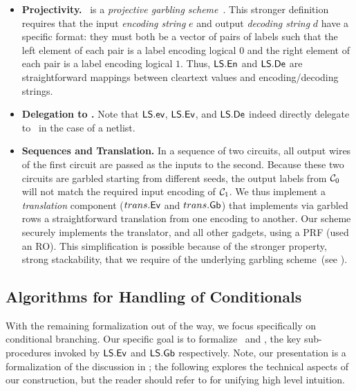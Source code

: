 \begin{itemize}
  \item \textbf{Projectivity.} \ourschemelong\
    is a \emph{projective garbling scheme}~\cite{CCS:BelHoaRog12}.
    This stronger definition requires that the input \emph{encoding string}
    $e$ and output \emph{decoding string} $d$ have a specific format:
    they must both be a vector of pairs of labels such that the left
    element of each pair is a label encoding logical $0$ and the right
    element of each pair is a label encoding logical $1$.
    Thus, $\textsf{LS}.\textsf{En}$ and $\textsf{LS}.\textsf{De}$ are straightforward
    mappings between cleartext values and encoding/decoding strings.
  \item \textbf{Delegation to \underscheme.} Note that
    $\textsf{LS}.\textsf{ev}$, $\textsf{LS}.\textsf{Ev}$, and $\textsf{LS}.\textsf{De}$ indeed
    directly delegate to \underscheme\ in the case of a netlist.
  \item \textbf{Sequences and Translation.} In a sequence of two
    circuits, all output wires of the first circuit are passed as the inputs
    to the second. Because these two circuits are garbled starting
    from different seeds, the output labels from $\mathcal C_0$ will not match the required
    input encoding of $\mathcal C_1$.
    We thus implement a \emph{translation} component ($trans.\textsf{Ev}$
    and $trans.\textsf{Gb}$) that implements via garbled rows a
    straightforward translation from one encoding to another.
    Our scheme securely implements the translator, and all other
    gadgets, using a PRF (\HK used an RO).
    This simplification is possible because of the stronger
    property, strong stackability, that we require
    of the underlying garbling scheme~(see ).
\end{itemize}

\subsection{Algorithms for Handling of Conditionals}\label{sec:approach-cond}

With the remaining formalization out of the way, we focus specifically
on conditional branching. Our specific goal is to formalize \evcond\
and \gbcond, the key sub-procedures invoked by $\textsf{LS}.\textsf{Ev}$ and
$\textsf{LS}.\textsf{Gb}$ respectively.
Note, our presentation is a formalization of the discussion in
; the following explores the technical aspects
of our construction, but the reader should refer to
\Cref{sec:techOverview} for unifying high level intuition.

